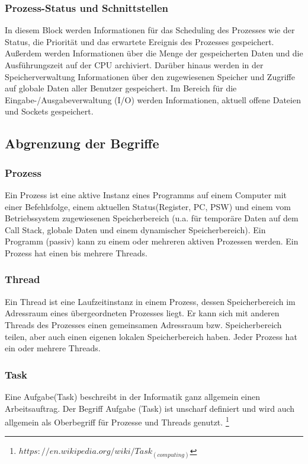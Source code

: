 \documentclass[numbers=noendperiod]{scrartcl}
\begin{document}
\subsubsection{Prozess-Status und Schnittstellen}
In diesem Block werden Informationen für das Scheduling des Prozesses wie der Status, die Priorität und das erwartete Ereignis des Prozesses gespeichert. Außerdem werden Informationen über die Menge der gespeicherten Daten und die Ausführungszeit auf der CPU archiviert. Darüber hinaus werden in der Speicherverwaltung Informationen über den zugewiesenen Speicher und Zugriffe auf globale Daten aller Benutzer gespeichert. Im Bereich für die Eingabe-/Ausgabeverwaltung (I/O) werden Informationen, aktuell offene Dateien und Sockets gespeichert.

\subsection{Abgrenzung der Begriffe}
\subsubsection*{Prozess}
Ein Prozess ist eine aktive Instanz eines Programms auf einem Computer mit einer Befehlsfolge, einem aktuellen Status(Register, PC, PSW) und einem vom Betriebssystem zugewiesenen Speicherbereich (u.a. für temporäre Daten auf dem Call Stack, globale Daten und einem dynamischer Speicherbereich). Ein Programm (passiv) kann zu einem oder mehreren aktiven Prozessen werden. Ein Prozess hat einen bis mehrere Threads.
\subsubsection*{Thread}
Ein Thread ist eine Laufzeitinstanz in einem Prozess, dessen Speicherbereich im Adressraum eines übergeordneten Prozesses liegt. Er kann sich mit anderen Threads des Prozesses einen gemeinsamen Adressraum bzw. Speicherbereich teilen, aber auch einen eigenen lokalen Speicherbereich haben. Jeder Prozess hat ein oder mehrere Threads. 
\subsubsection*{Task}
Eine Aufgabe(Task) beschreibt in der Informatik ganz allgemein einen Arbeitsauftrag. Der Begriff Aufgabe (Task) ist unscharf definiert und wird auch allgemein als Oberbegriff für Prozesse und Threads genutzt. \footnote{$ https://en.wikipedia.org/wiki/Task_(computing)$}
\end{document}
